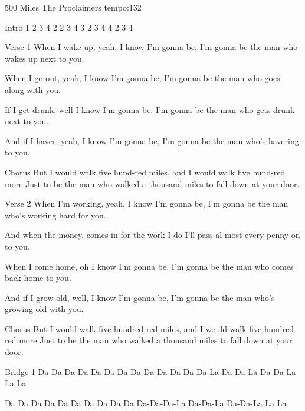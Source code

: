 \begin{song}[]{500 Miles The Proclaimers}
tempo:132

Intro
 1 2 3 4     2 2 3 4     3 2 3 4     4 2 3 4

Verse 1
When I wake up, yeah, I know I'm gonna be,
I'm gonna be the man who wakes up next to you.

When I go out, yeah, I know I'm gonna be,
I'm gonna be the man who goes along with you.

If I get drunk, well I know I'm gonna be,
I'm gonna be the man who gets drunk next to you.

And if I haver, yeah, I know I'm gonna be,
I'm gonna be the man who's havering to you.

Chorus
But I would walk  five hund-red miles, and
I    would     walk    five hund-red    more
Just to be the man who walked a thousand miles
to fall down at your door.    


Verse 2
When I'm working, yeah, I know I'm gonna be,
I'm gonna be the man who's working hard for you.

And when the money,    comes in for the work I do
I'll pass al-most every penny on to you.

When I come home, oh I know I'm gonna be,
I'm gonna be the man who comes back home to you.

And if I grow old, well, I know I'm gonna be,
I'm gonna be the man who's growing old with you.


Chorus
But I would walk five hundred-red miles, and
I would walk five hundred-red more
Just to be the man who walked a thousand miles
to fall down at your door.    



Bridge 1
Da Da Da Da          Da Da Da Da      Da Da Da-Da-Da-La Da-Da-La Da-Da-La La La

Da Da Da Da           Da Da Da Da      Da Da Da-Da-Da-La Da-Da-La Da-Da-La La La




\end{song}
